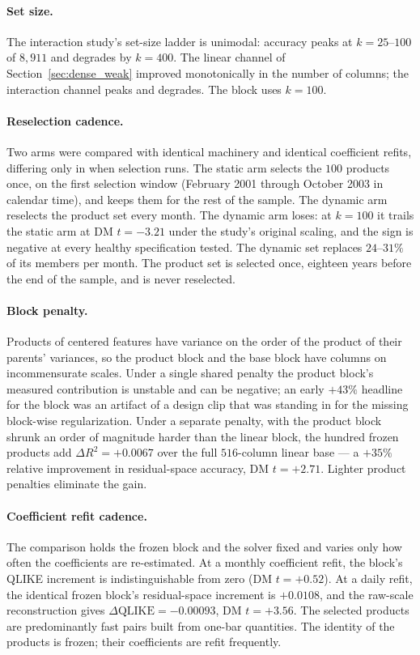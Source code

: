 \paragraph{Set size.} The interaction study's set-size ladder is
unimodal: accuracy peaks at $k = 25$--$100$ of $8{,}911$ and degrades by
$k = 400$. The linear channel of Section~\ref{sec:dense_weak} improved
monotonically in the number of columns; the interaction channel peaks and
degrades. The block uses $k = 100$.

\paragraph{Reselection cadence.} Two arms were compared with identical
machinery and identical coefficient refits, differing only in when
selection runs. The static arm selects the $100$ products once, on the
first selection window (February 2001 through October 2003 in calendar
time), and keeps them for the rest of the sample. The dynamic
arm reselects the product set every month. The dynamic arm loses: at
$k = 100$ it trails the static arm at DM $t = -3.21$ under the study's
original scaling, and the sign is negative at every healthy specification
tested. The dynamic set replaces $24$--$31\%$ of its members per month. The
product set is selected once, eighteen years before the end of the sample,
and is never reselected.

\paragraph{Block penalty.} Products of centered features have variance on
the order of the product of their parents' variances, so the product block
and the base block have columns on incommensurate scales.
Under a single shared penalty the product block's measured contribution is
unstable and can be negative; an early $+43\%$ headline for the block was
an artifact of a design clip that was standing in for the missing
block-wise regularization. Under a separate penalty, with the product block
shrunk an order of magnitude harder than the linear block, the hundred
frozen products add $\Delta R^2 = +0.0067$ over the full $516$-column
linear base --- a $+35\%$ relative improvement in residual-space accuracy,
DM $t = +2.71$. Lighter product penalties eliminate the gain.

\paragraph{Coefficient refit cadence.} The comparison holds the frozen
block and the solver fixed and varies only how often the coefficients are
re-estimated. At a monthly coefficient refit, the block's QLIKE increment
is indistinguishable from zero (DM $t = +0.52$). At a daily refit, the
identical frozen block's residual-space increment is $+0.0108$, and the
raw-scale reconstruction gives $\Delta\text{QLIKE} = -0.00093$, DM
$t = +3.56$. The selected products are predominantly fast pairs built from
one-bar quantities. The identity of the products is frozen; their
coefficients are refit frequently.

